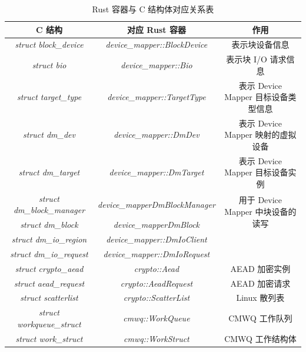 \begin{table}[H]
  \caption{Rust 容器与 C 结构体对应关系表}
  \begin{center}
  \begin{tabular}{ccc}
  \toprule
  C 结构                              & 对应 Rust 容器                  & 作用              \\
  \midrule
  \textit{struct block\_device}       & \textit{device\_mapper::BlockDevice}   & 表示块设备信息       \\ 
  \textit{struct bio}                 & \textit{device\_mapper::Bio}           &  表示块 I/O 请求信息 \\ 
  \textit{struct target\_type}        & \textit{device\_mapper::TargetType}  & 表示 Device Mapper 目标设备类型信息         \\ 
  \textit{struct dm\_dev}             & \textit{device\_mapper::DmDev}       & 表示 Device Mapper 映射的虚拟设备         \\ 
  \textit{struct dm\_target}          & \textit{device\_mapper::DmTarget}    & 表示 Device Mapper 目标设备实例         \\ 
  \textit{struct dm\_block\_manager}  & \textit{device\_mapperDmBlockManager}       & \multirow{2}{*}{用于 Device Mapper 中块设备的读写} \\ 
  \textit{struct dm\_block}           & \textit{device\_mapperDmBlock}              &                                       \\ 
  \textit{struct dm\_io\_region}      & \textit{device\_mapper::DmIoClient}       &                                       \\ 
  \textit{struct dm\_io\_request}     & \textit{device\_mapper::DmIoRequest}      &                                       \\ 
  \hline
  \textit{struct crypto\_aead}        & \textit{crypto::Aead}         & AEAD 加密实例 \\ 
  \textit{struct aead\_request}       & \textit{crypto::AeadRequest}  & AEAD 加密请求 \\ 
  \textit{struct scatterlist}         & \textit{crypto::ScatterList}  & Linux 散列表 \\ 
  \hline
  \textit{struct workqueue\_struct}   & \textit{cmwq::WorkQueue}   & CMWQ 工作队列 \\ 
  \textit{struct work\_struct}        & \textit{cmwq::WorkStruct}  & CMWQ 工作结构体 \\ 
  
  
  \bottomrule
  \end{tabular}
  \end{center}
\end{table}
